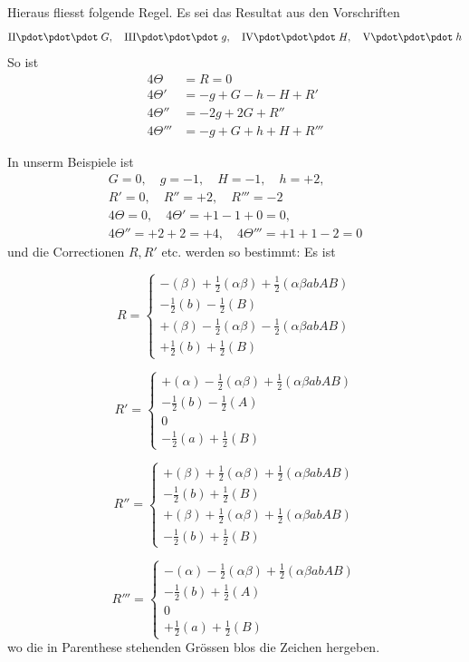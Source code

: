 Hieraus fliesst folgende Regel. Es sei das Resultat aus den Vorschriften
\[
\mathrm{II}\pdot\pdot\pdot\;G,\quad
\mathrm{III}\pdot\pdot\pdot\;g,\quad
\mathrm{IV}\pdot\pdot\pdot\;H,\quad
\mathrm{V}\pdot\pdot\pdot\;h
\]
So ist
\[
\begin{aligned}
4\Theta&=R=0\\
4\Theta'&=-g+G-h-H+R'\\
4\Theta''&=-2g+2G+R''\\
4\Theta'''&=-g+G+h+H+R'''
\end{aligned}
\]

In unserm Beispiele ist
\[
\begin{gathered}
G=0,\quad g=-1,\quad H=-1,\quad h=+2,\\
R'=0,\quad R''=+2,\quad R'''=-2\\
4\Theta=0,\quad4\Theta'=+1-1+0=0,\\
4\Theta''=+2+2=+4,\quad4\Theta'''=+1+1-2=0
\end{gathered}
\]
und die Correctionen $R,R'$ etc. werden so bestimmt: Es ist

\[
R=\left\{\begin{array}{l}
-(\beta)+\frac12(\alpha\beta)+\frac12(\alpha\beta abAB)\\
-\frac12(b)-\frac12(B)\\
+(\beta)-\frac12(\alpha\beta)-\frac12(\alpha\beta abAB)\\
+\frac12(b)+\frac12(B)
\end{array}\right.
\]

\[
R'=\left\{\begin{array}{l}
+(\alpha)-\frac12(\alpha\beta)+\frac12(\alpha\beta abAB)\\
-\frac12(b)-\frac12(A)\\
0\\
-\frac12(a)+\frac12(B)
\end{array}\right.
\]

\[
R''=\left\{\begin{array}{l}
+(\beta)+\frac12(\alpha\beta)+\frac12(\alpha\beta abAB)\\
-\frac12(b)+\frac12(B)\\
+(\beta)+\frac12(\alpha\beta)+\frac12(\alpha\beta abAB)\\
-\frac12(b)+\frac12(B)
\end{array}\right.
\]

\[
R'''=\left\{\begin{array}{l}
-(\alpha)-\frac12(\alpha\beta)+\frac12(\alpha\beta abAB)\\
-\frac12(b)+\frac12(A)\\
0\\
+\frac12(a)+\frac12(B)
\end{array}\right.
\]
wo die in Parenthese stehenden Grössen blos die Zeichen hergeben.

